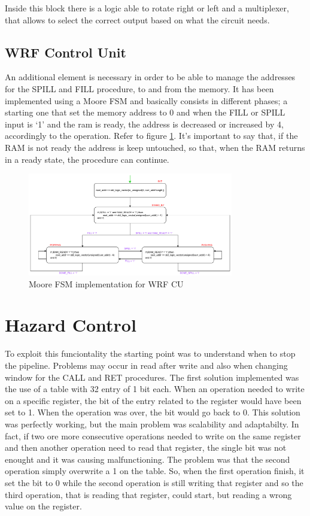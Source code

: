 Inside this block there is a logic able to rotate right or left and a multiplexer, that allows to select the correct output based on what the circuit needs. 

\subsection{WRF Control Unit}

An additional element is necessary in order to be able to manage the addresses for the SPILL and FILL procedure, to and from the memory. It has been implemented using a Moore FSM and basically consists in different phases; a starting one that set the memory address to 0 and when the FILL or SPILL input is `1' and the ram is ready, the address is decreased or increased by 4, accordingly to the operation. Refer to figure \ref{wrf_cu}. It's important to say that, if the RAM is not ready the address is keep untouched, so that, when the RAM returns in a ready state, the procedure can continue.


\begin{figure}[ht]
	\centering
	\includegraphics[width=0.8\textwidth]{chapters/4_DecodeStage/images/wRF_CU.pdf}
	\caption{Moore FSM implementation for WRF CU}
	\label{wrf_cu}
\end{figure}

\section{Hazard Control}
To exploit this funciontality the starting point was to understand when to stop the pipeline. Problems may occur in read after write and also when changing window for the CALL and RET procedures. 
The first solution implemented was the use of a table with 32 entry of 1 bit each. When an operation needed to write on a specific register, the bit of the entry related to the register would have been set to 1. When the operation was over, the bit would go back to 0. This solution was perfectly working, but the main problem was scalability and adaptabilty. In fact, if two ore more consecutive operations needed to write on the same register and then another operation need to read that register, the single bit was not enought and it was causing malfunctioning. The problem was that the second operation simply overwrite a 1 on the table. So, when the first operation finish, it set the bit to 0 while the second operation is still writing that register and so the third operation, that is reading that register, could start, but reading a wrong value on the register. 


